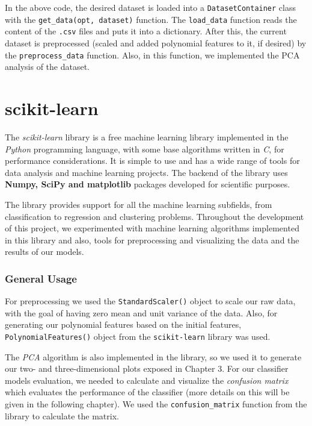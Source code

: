 

In the above code, the desired dataset is loaded into a \texttt{DatasetContainer} class 
with the \texttt{get\_data(opt, dataset)} function. The \texttt{load\_data} function 
reads the content of the \texttt{.csv} files and puts it into a dictionary. After 
this, the current dataset is preprocessed (scaled and added polynomial features 
to it, if desired) by the \texttt{preprocess\_data} function. Also, in this function, 
we implemented the PCA analysis of the dataset. 

\section{scikit-learn}

The {\it scikit-learn} library is a free machine learning library implemented in 
the {\it Python} programming language, with some base algorithms written in {\it C}, 
for performance considerations. It is simple to use and has a wide range of 
tools for data analysis and machine learning projects. The backend of the library 
uses {\bf Numpy, SciPy and matplotlib} packages developed for scientific purposes. 

The library provides support for all the machine learning subfields, from 
classification to regression and clustering problems. Throughout the development 
of this project, we experimented with machine learning algorithms implemented 
in this library and also, tools for preprocessing and visualizing the data and 
the results of our models. 

\subsubsection{General Usage}

For preprocessing we used the \texttt{StandardScaler()} object to scale our raw 
data, with the goal of having zero mean and unit variance of the data. Also, for generating 
our polynomial features based on the initial features, 
\texttt{PolynomialFeatures()} object from the \texttt{scikit-learn} library was used. 

The {\it PCA} algorithm is also implemented in the library, so we used it to 
generate our two- and three-dimensional plots exposed in Chapter 3. For our 
classifier models evaluation, we needed to calculate and visualize the 
{\it confusion matrix} which evaluates the performance of the classifier 
(more details on this will be given in the following chapter). We used the 
\texttt{confusion\_matrix} function from the library to calculate the matrix. 

